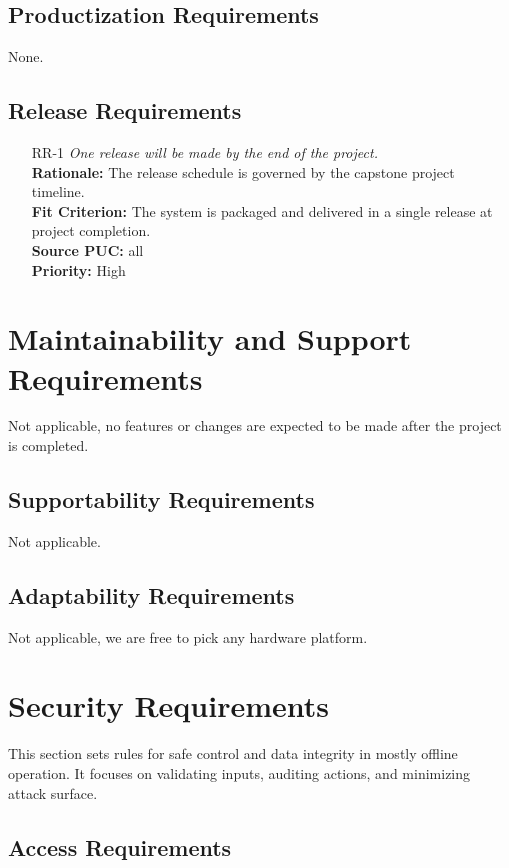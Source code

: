 \documentclass[12pt]{article}
\begin{document}
\subsection{Productization Requirements}

None.

\subsection{Release Requirements}
\begin{itemize}[leftmargin=*]
  \item[RR-1] \emph{One release will be made by the end of the project.}\\[2mm]
        \textbf{Rationale:} The release schedule is governed by the capstone project timeline.\\
        \textbf{Fit Criterion:} The system is packaged and delivered in a single release at project completion.\\
        \textbf{Source PUC:} all \\
        \textbf{Priority:} High
\end{itemize}

\section{Maintainability and Support Requirements}

Not applicable, no features or changes are expected to be made after the
project is completed.

\subsection{Supportability Requirements}

Not applicable.

\subsection{Adaptability Requirements}

Not applicable, we are free to pick any hardware platform.

\section{Security Requirements}
This section sets rules for safe control and data integrity in mostly offline
operation. It focuses on validating inputs, auditing actions, and minimizing
attack surface.
\subsection{Access Requirements}
\end{document}
